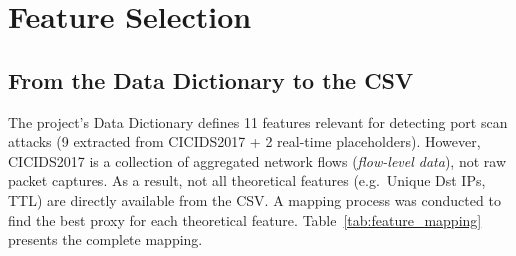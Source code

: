 \section{Feature Selection}

\subsection{From the Data Dictionary to the CSV}

The project's Data Dictionary defines 11 features relevant for detecting port scan attacks (9 extracted from CICIDS2017 + 2 real-time placeholders). However, CICIDS2017 is a collection of aggregated network flows (\textit{flow-level data}), not raw packet captures. As a result, not all theoretical features (e.g.\ Unique Dst IPs, TTL) are directly available from the CSV. A mapping process was conducted to find the best proxy for each theoretical feature. Table~\ref{tab:feature_mapping} presents the complete mapping.


